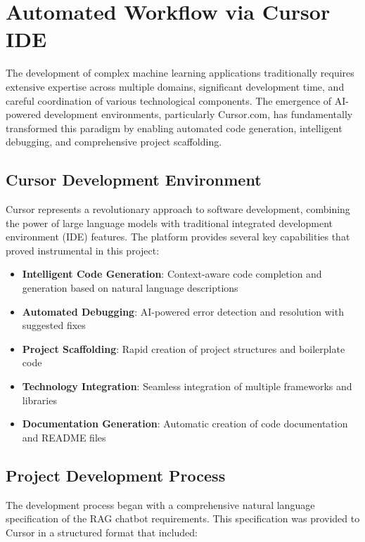 \documentclass[12pt,letterpaper]{article}
\begin{document}
\newpage

\section{Automated Workflow via Cursor IDE}

The development of complex machine learning applications traditionally requires extensive expertise across multiple domains, significant development time, and careful coordination of various technological components. The emergence of AI-powered development environments, particularly Cursor.com, has fundamentally transformed this paradigm by enabling automated code generation, intelligent debugging, and comprehensive project scaffolding.

\subsection{Cursor Development Environment}

Cursor represents a revolutionary approach to software development, combining the power of large language models with traditional integrated development environment (IDE) features. The platform provides several key capabilities that proved instrumental in this project:

\begin{itemize}
    \item \textbf{Intelligent Code Generation}: Context-aware code completion and generation based on natural language descriptions
    \item \textbf{Automated Debugging}: AI-powered error detection and resolution with suggested fixes
    \item \textbf{Project Scaffolding}: Rapid creation of project structures and boilerplate code
    \item \textbf{Technology Integration}: Seamless integration of multiple frameworks and libraries
    \item \textbf{Documentation Generation}: Automatic creation of code documentation and README files
\end{itemize}

\subsection{Project Development Process}

The development process began with a comprehensive natural language specification of the RAG chatbot requirements. This specification was provided to Cursor in a structured format that included:
\end{document}

